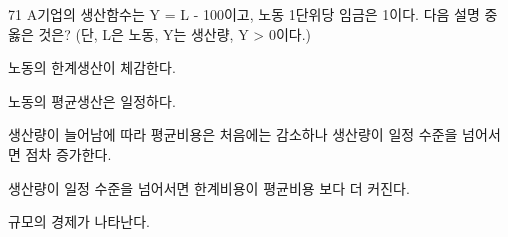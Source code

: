 \begin{question}{71}
A기업의 생산함수는 Y = L - 100이고, 노동 1단위당 임금은 1이다. 다음 설명 중 옳은 것은? (단, L은 노동, Y는 생산량, Y > 0이다.)
\begin{choices}
  \item 노동의 한계생산이 체감한다.
  \item 노동의 평균생산은 일정하다.
  \item 생산량이 늘어남에 따라 평균비용은 처음에는 감소하나 생산량이 일정 수준을 넘어서면 점차 증가한다.
  \item 생산량이 일정 수준을 넘어서면 한계비용이 평균비용 보다 더 커진다.
  \item 규모의 경제가 나타난다.
\end{choices}
\end{question}
